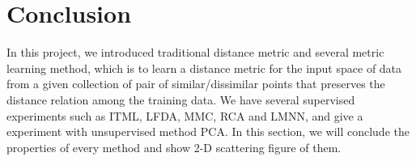 \documentclass[conference]{IEEEtran}
\begin{document}
\section{Conclusion}

In this project, we introduced traditional distance metric and several metric learning method, which is to learn a distance metric for the input space of data from a given collection of pair of similar/dissimilar points that preserves the distance relation among the training data. We have several supervised experiments such as ITML, LFDA, MMC, RCA and LMNN, and give a experiment with unsupervised method PCA. In this section, we will conclude the properties of every method and show 2-D scattering figure of them.


\end{document}
